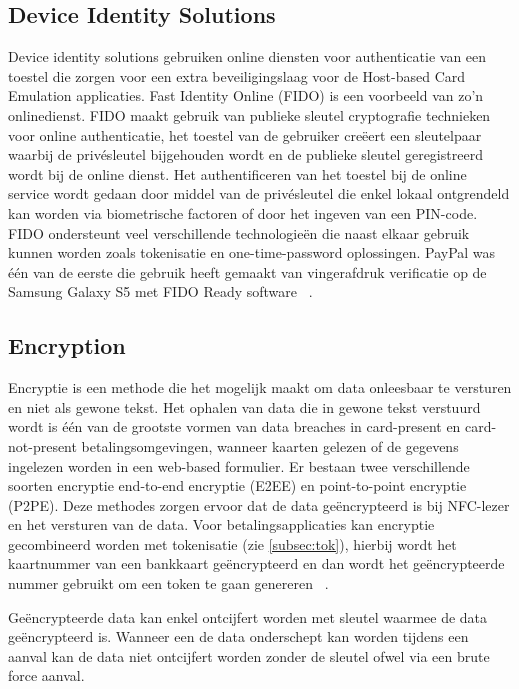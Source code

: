 \subsection{Device Identity Solutions}
Device identity solutions gebruiken online diensten voor authenticatie van een toestel die zorgen voor een extra beveiligingslaag voor de Host-based Card Emulation applicaties. Fast Identity Online (FIDO) is een voorbeeld van zo'n onlinedienst. FIDO maakt gebruik van publieke sleutel cryptografie technieken voor online authenticatie, het toestel van de gebruiker creëert een sleutelpaar waarbij de privésleutel bijgehouden wordt en de publieke sleutel geregistreerd wordt bij de online dienst. Het authentificeren van het toestel bij de online service wordt gedaan door middel van de privésleutel die enkel lokaal ontgrendeld kan worden via biometrische factoren of door het ingeven van een PIN-code.
FIDO ondersteunt veel verschillende technologieën die naast elkaar gebruik kunnen worden zoals tokenisatie en one-time-password oplossingen. PayPal was één van de eerste die gebruik heeft gemaakt van vingerafdruk verificatie op de Samsung Galaxy S5 met FIDO Ready software ~\autocite{SCA2014}.

\subsection{Encryption}
Encryptie is een methode die het mogelijk maakt om data onleesbaar te versturen en niet als gewone tekst. Het ophalen van data die in gewone tekst verstuurd wordt is één van de grootste vormen van data breaches in card-present en card-not-present betalingsomgevingen, wanneer kaarten gelezen of de gegevens ingelezen worden in een web-based formulier. Er bestaan twee verschillende soorten encryptie end-to-end encryptie (E2EE) en point-to-point encryptie (P2PE). Deze methodes zorgen ervoor dat de data geëncrypteerd is bij NFC-lezer en het versturen van de data. Voor betalingsapplicaties kan encryptie gecombineerd worden met tokenisatie (zie \ref{subsec:tok}), hierbij wordt het kaartnummer van een bankkaart geëncrypteerd en dan wordt het geëncrypteerde nummer gebruikt om een token te gaan genereren ~\autocite{SCA2014}.

Geëncrypteerde data kan enkel ontcijfert worden met sleutel waarmee de data geëncrypteerd is. Wanneer een de data onderschept kan worden tijdens een aanval kan de data niet ontcijfert worden zonder de sleutel ofwel via een brute force aanval.

